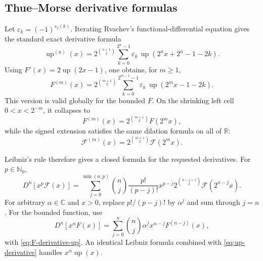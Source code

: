\documentclass[11pt,oneside]{article}
\theoremstyle{definition}
\theoremstyle{remark}
\newcommand{\Fs}{\mathcal F}
\newcommand{\Up}{\operatorname{up}}
\newcommand{\R}{\mathbb R}
\newcommand{\C}{\mathbb C}
\newcommand{\N}{\mathbb N}
\newcommand{\fall}[2]{#1^{\underline{#2}}}
\newcommand{\eps}{\varepsilon}
\newcommand{\1}{\mathbf 1}
\begin{document}
\subsection{Thue--Morse derivative formulas}
Let \(\eps_k=(-1)^{s_2(k)}\).  Iterating Rvachev's functional-differential
equation gives the standard exact derivative formula
\begin{equation}
 \boxed{\quad
 \Up^{(n)}(x)=2^{\binom{n+1}{2}}
 \sum_{k=0}^{2^n-1}\eps_k\,
 \Up(2^nx+2^n-1-2k).
 \quad}                                                        \label{eq:up-derivative}
\end{equation}
Using \(F'(x)=2\Up(2x-1)\), one obtains, for \(m\geq1\),
\begin{equation}
 \boxed{\quad
 F^{(m)}(x)=2^{\binom{m+1}{2}}
 \sum_{k=0}^{2^{m-1}-1}\eps_k\,
 \Up(2^mx-1-2k).
 \quad}                                                        \label{eq:F-derivative-up}
\end{equation}
This version is valid globally for the bounded \(F\).  On the shrinking left
cell \(0<x<2^{-m}\), it collapses to
\begin{equation}
 F^{(m)}(x)=2^{\binom{m+1}{2}}F(2^mx),                          \label{eq:F-left-higher}
\end{equation}
while the signed extension satisfies the same dilation formula on all of
\(\R\):
\begin{equation}
 \Fs^{(m)}(x)=2^{\binom{m+1}{2}}\Fs(2^mx).                     \label{eq:Fs-higher}
\end{equation}

Leibniz's rule therefore gives a closed formula for the requested derivatives.
For \(p\in\N_0\),
\begin{equation}
 D^n[x^p\Fs(x)]
 =\sum_{j=0}^{\min(n,p)}\binom nj\frac{p!}{(p-j)!}x^{p-j}
 2^{\binom{n-j+1}{2}}\Fs(2^{n-j}x).                            \label{eq:derivative-signed-p}
\end{equation}
For arbitrary \(\alpha\in\C\) and \(x>0\), replace
\(p!/(p-j)!\) by \(\fall\alpha j\) and sum through \(j=n\).
For the bounded function, use
\begin{equation}
 D^n[x^\alpha F(x)]
 =\sum_{j=0}^{n}\binom nj\fall\alpha j x^{\alpha-j}F^{(n-j)}(x),
                                                                    \label{eq:derivative-bounded-alpha}
\end{equation}
with \eqref{eq:F-derivative-up}.  An identical Leibniz formula combined with
\eqref{eq:up-derivative} handles \(x^\alpha\Up(x)\).
\end{document}
